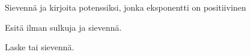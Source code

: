 \begin{tehtavasivu}
    \begin{tehtava}
         Sievennä ja kirjoita potenssiksi, jonka eksponentti on positiivinen
        
        \begin{vastaus}
        \end{vastaus}
    \end{tehtava}
    
    \begin{tehtava}
        Esitä ilman sulkuja ja sievennä.
        
        \begin{vastaus}
        \end{vastaus}
    \end{tehtava}

Laske tai sievennä.
    \begin{tehtava}
        \begin{vastaus}
        \end{vastaus}
    \end{tehtava}    
    
    \begin{tehtava}
        \begin{vastaus}
        \end{vastaus}
    \end{tehtava}     


\end{tehtavasivu}
